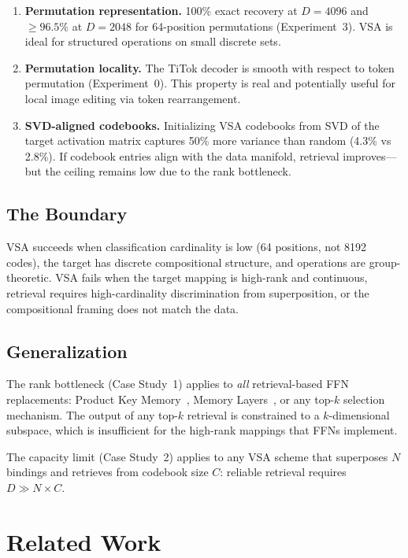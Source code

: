 \documentclass{article}
\begin{document}
\begin{enumerate}[leftmargin=*]
\item \textbf{Permutation representation.} 100\% exact recovery at $D{=}4096$ and ${\ge}96.5\%$ at $D{=}2048$ for 64-position permutations (Experiment~3). VSA is ideal for structured operations on small discrete sets.
\item \textbf{Permutation locality.} The TiTok decoder is smooth with respect to token permutation (Experiment~0). This property is real and potentially useful for local image editing via token rearrangement.
\item \textbf{SVD-aligned codebooks.} Initializing VSA codebooks from SVD of the target activation matrix captures 50\% more variance than random (4.3\% vs 2.8\%). If codebook entries align with the data manifold, retrieval improves---but the ceiling remains low due to the rank bottleneck.
\end{enumerate}

\subsection{The Boundary}

VSA succeeds when classification cardinality is low (64 positions, not 8192 codes), the target has discrete compositional structure, and operations are group-theoretic.
VSA fails when the target mapping is high-rank and continuous, retrieval requires high-cardinality discrimination from superposition, or the compositional framing does not match the data.

\subsection{Generalization}

The rank bottleneck (Case Study~1) applies to \emph{all} retrieval-based FFN replacements: Product Key Memory~\citep{lample2019large}, Memory Layers~\citep{wu2024memory}, or any top-$k$ selection mechanism.
The output of any top-$k$ retrieval is constrained to a $k$-dimensional subspace, which is insufficient for the high-rank mappings that FFNs implement.

The capacity limit (Case Study~2) applies to any VSA scheme that superposes $N$ bindings and retrieves from codebook size $C$: reliable retrieval requires $D \gg N \times C$.

\section{Related Work}
\label{sec:related}
\end{document}
